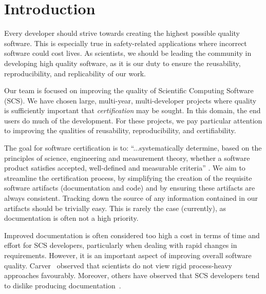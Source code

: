 \documentclass[sigconf]{acmart}
\begin{document}

\maketitle

\section{Introduction} \label{SecIntroduction}

Every developer should strive towards creating the highest possible quality 
software. This is especially true in safety-related applications where 
incorrect software could cost lives. As scientists, we should be leading the 
community in developing high quality software, as it is our duty to ensure the 
reusability, reproducibility, and replicability of our work.

Our team is focused on improving the quality of Scientific Computing Software (SCS).
We have chosen large, multi-year, multi-developer projects where quality is
sufficiently important that \emph{certification} may be sought.  In this 
domain, the end users do much of the development. For these projects, we pay
particular attention to improving the qualities of reusability, reproducibility,
and certifiability. 

The goal for software certification is to: ``...systematically determine, based
on the principles of science, engineering and measurement theory, whether a
software product satisfies accepted, well-defined and measurable criteria''
\cite[p.~12]{HatcliffEtAl2009}.  We aim to streamline the certification process,
by simplifying the creation of the requisite software artifacts (documentation
and code) and by ensuring these artifacts are always consistent. Tracking
down the source of any information contained in our artifacts should be
trivially easy.  This is rarely the case (currently), as documentation is often
not a high priority.

Improved documentation is often considered too high a cost in terms of time and 
effort for SCS developers, particularly when dealing with rapid changes in 
requirements. However, it is an important aspect of improving overall software 
quality. Carver~\cite{CarverEtAl2007} observed that scientists do not view 
rigid process-heavy approaches favourably. Moreover, others have observed that
SCS developers tend to dislike producing documentation~\cite[p.~373]{Roache1998}.
\end{document}
